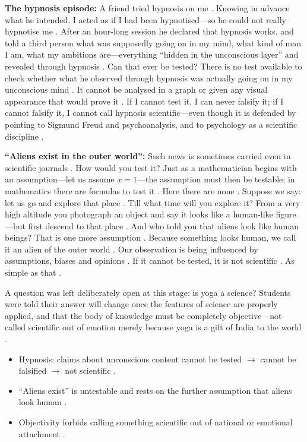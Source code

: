 \begin{ExampleBox}
\textbf{The hypnosis episode:} A friend tried hypnosis on me . Knowing in advance what he intended, I acted as if I had been hypnotised---so he could not really hypnotise me . After an hour-long session he declared that hypnosis works, and told a third person what was supposedly going on in my mind, what kind of man I am, what my ambitions are---everything ``hidden in the unconscious layer'' and revealed through hypnosis . Can that ever be tested? There is no test available to check whether what he observed through hypnosis was actually going on in my unconscious mind . It cannot be analysed in a graph or given any visual appearance that would prove it . If I cannot test it, I can never falsify it; if I cannot falsify it, I cannot call hypnosis scientific---even though it is defended by pointing to Sigmund Freud and psychoanalysis, and to psychology as a scientific discipline .
\end{ExampleBox}

\begin{ExampleBox}
\textbf{``Aliens exist in the outer world'':} Such news is sometimes carried even in scientific journals . How would you test it? Just as a mathematician begins with an assumption---let us assume $x = 1$---the assumption must then be testable; in mathematics there are formulas to test it . Here there are none . Suppose we say: let us go and explore that place . Till what time will you explore it? From a very high altitude you photograph an object and say it looks like a human-like figure---but first descend to that place . And who told you that aliens look like human beings? That is one more assumption . Because something looks human, we call it an alien of the outer world . Our observation is being influenced by assumptions, biases and opinions . If it cannot be tested, it is not scientific . As simple as that .
\end{ExampleBox}

\begin{CriticalPoint}
A question was left deliberately open at this stage: is yoga a science? Students were told their answer will change once the features of science are properly applied, and that the body of knowledge must be completely objective---not called scientific out of emotion merely because yoga is a gift of India to the world .
\end{CriticalPoint}

\begin{QuickRevision}
\begin{itemize}
    \item Hypnosis: claims about unconscious content cannot be tested $\rightarrow$ cannot be falsified $\rightarrow$ not scientific .
    \item ``Aliens exist'' is untestable and rests on the further assumption that aliens look human .
    \item Objectivity forbids calling something scientific out of national or emotional attachment .
\end{itemize}
\end{QuickRevision}

